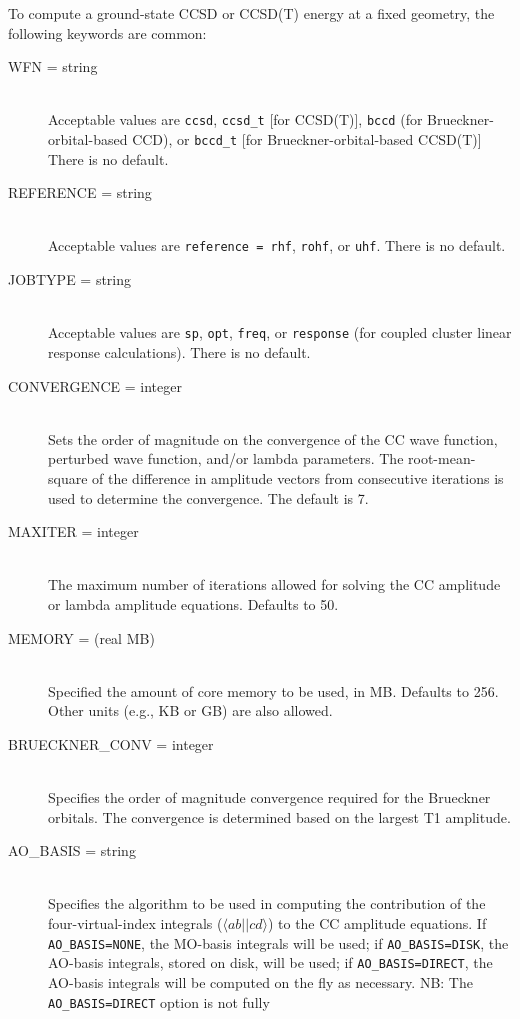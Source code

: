 To compute a ground-state CCSD or CCSD(T) energy at a fixed geometry,
the following keywords are common:
\begin{description}
\item[WFN = string]\mbox{}\\
Acceptable values are {\tt ccsd}, {\tt ccsd\_t} [for CCSD(T)], {\tt bccd} 
(for Brueckner-orbital-based CCD), or {\tt bccd\_t} [for 
Brueckner-orbital-based CCSD(T)] There is no default.
\item[REFERENCE = string]\mbox{}\\
Acceptable values are {\tt reference = rhf}, {\tt rohf}, or {\tt uhf}.
There is no default.
\item[JOBTYPE = string]\mbox{}\\
Acceptable values are {\tt sp}, {\tt opt}, {\tt freq}, or {\tt response}
(for coupled cluster linear response calculations).  There is no default.
\item[CONVERGENCE = integer]\mbox{}\\
Sets the order of magnitude on the convergence of the CC wave function,
perturbed wave function, and/or lambda parameters.  The root-mean-square of
the difference in amplitude vectors from consecutive iterations is used to
determine the convergence.  The default is 7.
\item[MAXITER = integer]\mbox{}\\
The maximum number of iterations allowed for solving the CC amplitude or
lambda amplitude equations.  Defaults to 50.
\item[MEMORY = (real MB)]\mbox{}\\
Specified the amount of core memory to be used, in MB.  Defaults to 256.
Other units (e.g., KB or GB) are also allowed.
\item[BRUECKNER\_CONV = integer]\mbox{}\\
Specifies the order of magnitude convergence required for the Brueckner
orbitals.  The convergence is determined based on the largest T1
amplitude.
\item[AO\_BASIS = string]\mbox{}\\
Specifies the algorithm to be used in computing the contribution of the
four-virtual-index integrals ($\langle ab||cd\rangle$) to the CC amplitude
equations.  If {\tt AO\_BASIS=NONE}, the MO-basis integrals will be used;
if {\tt AO\_BASIS=DISK}, the AO-basis integrals, stored on disk, will be
used; if {\tt AO\_BASIS=DIRECT}, the AO-basis integrals will be computed on
the fly as necessary.  NB: The {\tt AO\_BASIS=DIRECT} option is not fully

\end{description}
